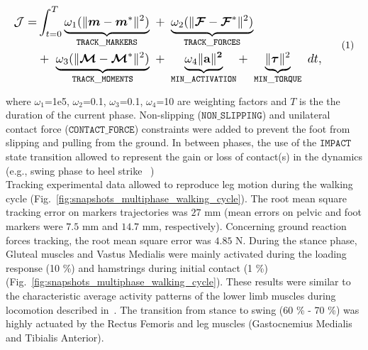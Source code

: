 \[ 
\resizebox{0.9\columnwidth}{!}{$ 
\begin{aligned}
\mathcal{J} = &\int_{t=0}^{T}\underbrace{\omega_1(\|\bm{m} - \bm{m}^*\|^{2})}_{\mathtt{TRACK\_MARKERS}}~ 
+ ~ \underbrace{\omega_2(\|\bm{\mathcal{F}} - \bm{\mathcal{F}}^*\|^{2})}_{\mathtt{TRACK\_FORCES}}\\
&+ ~ \underbrace{\omega_3(\|\bm{\mathcal{M}} - \bm{\mathcal{M}}^*\|^{2})}_{\mathtt{TRACK\_MOMENTS}}~
+ ~ \underbrace{\omega_4\|\bf{a}\|^2}_{\mathtt{MIN\_ACTIVATION}}
+ ~ \underbrace{\|\boldsymbol{\tau}\|^2}_{\mathtt{MIN\_TORQUE}}~dt, 
\end{aligned}  
$}  
\addtag  
\label{eq:ocp_walk}  
\]

\noindent where $\omega_1$=1e5, $\omega_2$=0.1, $\omega_3$=0.1, $\omega_4$=10 are  weighting factors and $T$ is the the duration of the current phase.
Non-slipping ($\mathtt{NON\_SLIPPING}$) and unilateral contact force ($\mathtt{CONTACT\_FORCE}$) constraints were added to prevent the foot from slipping and pulling from the ground. 
In between phases, the use of the $\mathtt{IMPACT}$ state transition allowed to represent the gain or loss of contact(s) in the dynamics (e.g., swing phase to heel strike ~\cite{felis_synthesis_2016}) \\

Tracking experimental data allowed to reproduce leg motion during the walking cycle (Fig.~\ref{fig:snapshots_multiphase_walking_cycle}). 
The root mean square tracking error on markers trajectories was $27$ mm (mean errors on pelvic and foot markers were $7.5$ mm and $14.7$ mm, respectively). 
Concerning ground reaction forces tracking, the root mean square error was $4.85$ N.
During the stance phase, Gluteal muscles and Vastus Medialis were mainly activated during the loading response (10 \%) and hamstrings during initial contact (1 \%) (Fig.~\ref{fig:snapshots_multiphase_walking_cycle}). 
These results were similar to the characteristic average activity patterns of the lower limb muscles during locomotion described in~\cite{winter_biomechanics_1991}. 
The transition from stance to swing (60 \% - 70 \%) was highly actuated by the Rectus Femoris and leg muscles (Gastocnemius Medialis and Tibialis Anterior).
